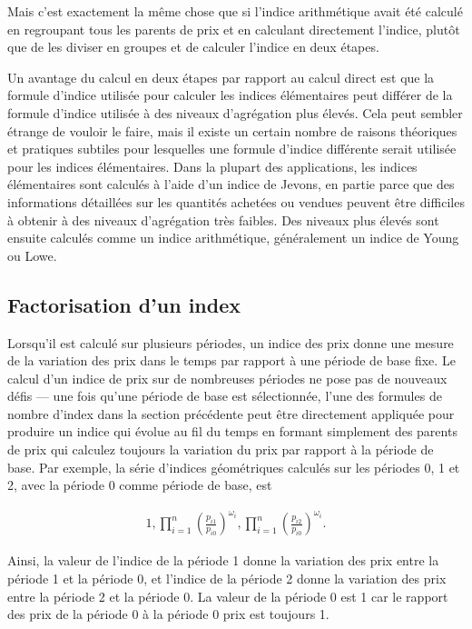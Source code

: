 \documentclass[
]{article}
\begin{document}
Mais c'est exactement la même chose que si l'indice arithmétique avait été calculé en regroupant tous les parents de prix et en calculant directement l'indice, plutôt que de les diviser en groupes et de calculer l'indice en deux étapes.

Un avantage du calcul en deux étapes par rapport au calcul direct est que la formule d'indice utilisée pour calculer les indices élémentaires peut différer de la formule d'indice utilisée à des niveaux d'agrégation plus élevés. Cela peut sembler étrange de vouloir le faire, mais il existe un certain nombre de raisons théoriques et pratiques subtiles pour lesquelles une formule d'indice différente serait utilisée pour les indices élémentaires. Dans la plupart des applications, les indices élémentaires sont calculés à l'aide d'un indice de Jevons, en partie parce que des informations détaillées sur les quantités achetées ou vendues peuvent être difficiles à obtenir à des niveaux d'agrégation très faibles. Des niveaux plus élevés sont ensuite calculés comme un indice arithmétique, généralement un indice de Young ou Lowe.

\hypertarget{factorisation-dun-index}{%
\subsection{Factorisation d'un index}\label{factorisation-dun-index}}

Lorsqu'il est calculé sur plusieurs périodes, un indice des prix donne une mesure de la variation des prix dans le temps par rapport à une période de base fixe. Le calcul d'un indice de prix sur de nombreuses périodes ne pose pas de nouveaux défis --- une fois qu'une période de base est sélectionnée, l'une des formules de nombre d'index dans la section précédente peut être directement appliquée pour produire un indice qui évolue au fil du temps en formant simplement des parents de prix qui calculez toujours la variation du prix par rapport à la période de base. Par exemple, la série d'indices géométriques calculés sur les périodes 0, 1 et 2, avec la période 0 comme période de base, est

\begin{align*}
1, \prod_{i = 1}^{n} \left (\frac{p_{i1}}{p_{i0}} \right)^{\omega_{i}}, \prod_{i = 1}^{n} \left (\frac{p_{i2}}{p_{i0}} \right)^{\omega_{i}}.
\end{align*}

Ainsi, la valeur de l'indice de la période 1 donne la variation des prix entre la période 1 et la période 0, et l'indice de la période 2 donne la variation des prix entre la période 2 et la période 0. La valeur de la période 0 est 1 car le rapport des prix de la période 0 à la période 0 prix est toujours 1.
\end{document}
